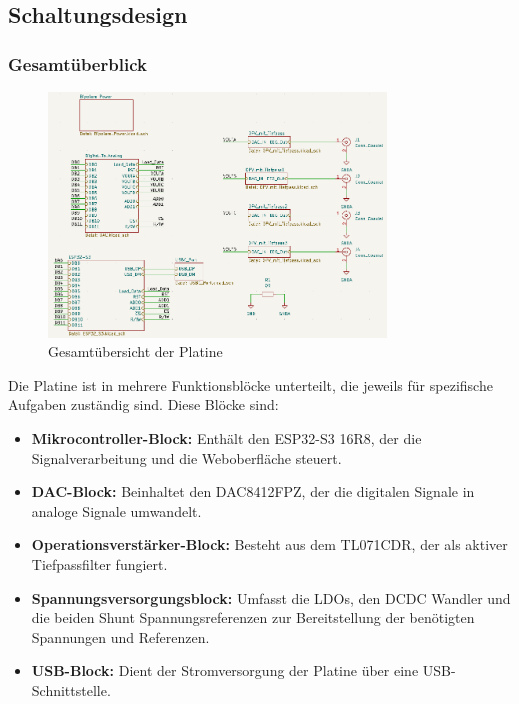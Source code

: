 \subsection{Schaltungsdesign}
\subsubsection{Gesamtüberblick}
\begin{figure}[H]
    \centering
    \includegraphics[width=0.8\textwidth]{bilder/Platine_gesamt.png}
    \caption{Gesamtübersicht der Platine}
    \label{fig:gesamtuebersicht}
\end{figure}
Die Platine ist in mehrere Funktionsblöcke unterteilt, die jeweils für spezifische Aufgaben zuständig sind. Diese Blöcke sind:
\begin{itemize}
    \item \textbf{Mikrocontroller-Block:} Enthält den ESP32-S3 16R8, der die Signalverarbeitung und die Weboberfläche steuert.
    \item \textbf{DAC-Block:} Beinhaltet den DAC8412FPZ, der die digitalen Signale in analoge Signale umwandelt.
    \item \textbf{Operationsverstärker-Block:} Besteht aus dem TL071CDR, der als aktiver Tiefpassfilter fungiert.
    \item \textbf{Spannungsversorgungsblock:} Umfasst die LDOs, den DCDC Wandler und die beiden Shunt Spannungsreferenzen zur Bereitstellung der benötigten Spannungen und Referenzen.
    \item \textbf{USB-Block:} Dient der Stromversorgung der Platine über eine USB-Schnittstelle.
\end{itemize}

